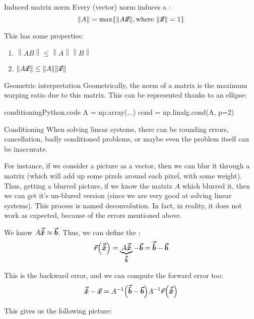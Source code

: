 \documentclass[a4paper]{article}
\begin{document}
\begin{parag}{Induced matrix norm}
    Every (vector) norm induces a : 
    \[\left\|A\right\| = \max\left\{\left\|A \bvec{x}\right\|, \text{where } \left\|\bvec{x}\right\| = 1\right\}\]
    
    This has some properties: 
    \begin{enumerate}
        \item $\left\|AB\right\| \leq \left\|A\right\|\left\|B\right\|$
        \item $\left\|A \bvec{x}\right\| \leq \left\|A\right\| \left\|\bvec{x}\right\|$
    \end{enumerate}

    \begin{subparag}{Geometric interpretation}
        Geometrically, the norm of a matrix is the maximum warping ratio due to this matrix. This can be represented thanks to an ellipse:
    \end{subparag}
    
\end{parag}


\begin{filecontents*}[overwrite]{conditioningPython.code}
A = np.array(...)
cond = np.linalg.cond(A, p=2)
\end{filecontents*}

\begin{parag}{Conditioning}
    When solving linear systems, there can be rounding errors, cancellation, badly conditioned problems, or maybe even the problem itself can be inaccurate. 

    For instance, if we consider a picture as a vector, then we can blur it through a matrix (which will add up some pixels around each pixel, with some weight). Thus, getting a blurred picture, if we know the matrix $A$ which blurred it, then we can get it's un-blured version (since we are very good at solving linear systems). This process is named deconvolution. In fact, in reality, it does not work as expected, because of the errors mentioned above.

    We know $A \bm{\protect\vec{\hat{x}}} \approx \bm{\protect\vec{b}}$. Thus, we can define the : 
    \[\bvec{r}\left(\bvec{\hat{x}}\right) = \underbrace{A \bvec{\hat{x}}}_{\bvec{\hat{b}}} - \bvec{b} = \bvec{\hat{b}} - \bvec{b}\]
    
    This is the backward error, and we can compute the forward error too:
    \[\bvec{\hat{x}} - \bvec{x} = A^{-1}\left(\bvec{\hat{b}} - \bvec{b}\right) A^{-1} \bvec{r}\left(\bvec{\hat{x}}\right)\]

    This gives us the following picture:
\end{parag}
\end{document}
